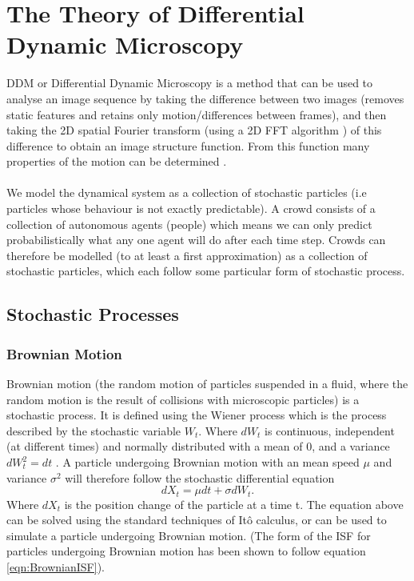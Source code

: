 \documentclass[11pt]{article}
\begin{document}
\section{The Theory of Differential Dynamic Microscopy}
\label{section:theory}
DDM or Differential Dynamic Microscopy is a method that can be used to analyse an image sequence by taking the difference between two images (removes static features and retains only motion/differences between frames), and then taking the 2D spatial Fourier transform (using a 2D FFT algorithm \cite{fft}) of this difference to obtain an image structure function.
From this function many properties of the motion can be determined \cite{ddm1}. 
\\\\
We model the dynamical system as a collection of stochastic particles (i.e particles whose behaviour is not exactly predictable). A crowd consists of a collection of autonomous agents (people) which means we can only predict probabilistically what any one agent will do after each time step. Crowds can therefore be modelled (to at least a first approximation) as a collection of stochastic particles, which each follow some particular form of stochastic process.

\subsection{Stochastic Processes}
\subsubsection{Brownian Motion}
Brownian motion (the random motion of particles suspended in a fluid, where the random motion is the result of collisions with microscopic particles) is a stochastic process. It is defined using the Wiener process which is the process described by the stochastic variable $W_t$. Where $dW_t$ is continuous, independent (at different times) and normally distributed with a mean of 0, and a variance $dW_t^2 = dt$ \cite{sde}. A particle undergoing Brownian motion with an mean speed $\mu$ and variance $\sigma^2$ will therefore follow the stochastic differential equation
\begin{equation}
\label{eqn:brownianSDE}
dX_t = \mu dt + \sigma dW_t.
\end{equation}
Where $dX_t$ is the position change of the particle at a time t. The equation above can be solved using the standard techniques of Itô calculus, or can be used to simulate a particle undergoing Brownian motion. (The form of the ISF for particles undergoing Brownian motion has been shown to follow equation \ref{eqn:BrownianISF}).
\end{document}
